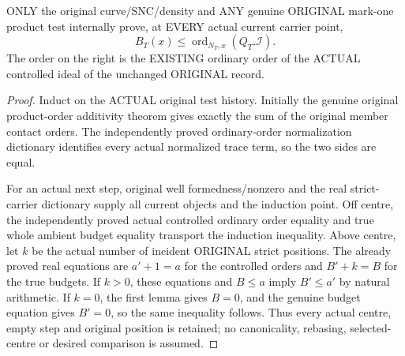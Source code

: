 \begin{theorem}
\label{hir:sharp-original-curve-controlled-order-dominates-ambient-budget}
\leanok
ONLY the original curve/SNC/density and ANY genuine ORIGINAL mark-one
product test internally prove, at EVERY actual current carrier point,
\[
 B_T(x)\leq\operatorname{ord}_{N_T,x}(Q_T.\mathcal I).
\]
The order on the right is the EXISTING ordinary order of the ACTUAL
controlled ideal of the unchanged ORIGINAL record.
\end{theorem}
\begin{proof}
Induct on the ACTUAL original test history. Initially the genuine
original product-order additivity theorem gives exactly the sum of the
original member contact orders. The independently proved ordinary-order
normalization dictionary identifies every actual normalized trace term,
so the two sides are equal.

For an actual next step, original well formedness/nonzero and the real
strict-carrier dictionary supply all current objects and the induction
point. Off centre, the independently proved actual controlled ordinary
order equality and true whole ambient budget equality transport the
induction inequality. Above centre, let $k$ be the actual number of
incident ORIGINAL strict positions. The already proved real equations
are $a'+1=a$ for the controlled orders and $B'+k=B$ for the true budgets.
If $k>0$, these equations and $B\leq a$ imply $B'\leq a'$ by natural
arithmetic. If $k=0$, the first lemma gives $B=0$, and the genuine budget
equation gives $B'=0$, so the same inequality follows. Thus every
actual centre, empty step and original position is retained; no
canonicality, rebasing, selected-centre or desired comparison is assumed.
\end{proof}

